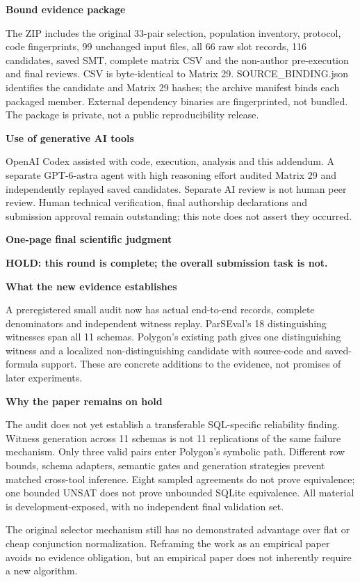 \documentclass[10pt]{article}
\newcommand{\head}[1]{\medskip\textbf{#1}\par}
\begin{document}
\head{Bound evidence package}
The ZIP includes the original 33-pair selection, population inventory, protocol, code fingerprints, 99 unchanged input files, all 66 raw slot records, 116 candidates, saved SMT, complete matrix CSV and the non-author pre-execution and final reviews. CSV is byte-identical to Matrix 29. SOURCE\_BINDING.json identifies the candidate and Matrix 29 hashes; the archive manifest binds each packaged member. External dependency binaries are fingerprinted, not bundled. The package is private, not a public reproducibility release.

\head{Use of generative AI tools}
OpenAI Codex assisted with code, execution, analysis and this addendum. A separate GPT-6-astra agent with high reasoning effort audited Matrix 29 and independently replayed saved candidates. Separate AI review is not human peer review. Human technical verification, final authorship declarations and submission approval remain outstanding; this note does not assert they occurred.

\newpage
{\Large\bfseries One-page final scientific judgment}\par
\textbf{HOLD: this round is complete; the overall submission task is not.}

\head{What the new evidence establishes}
A preregistered small audit now has actual end-to-end records, complete denominators and independent witness replay. ParSEval's 18 distinguishing witnesses span all 11 schemas. Polygon's existing path gives one distinguishing witness and a localized non-distinguishing candidate with source-code and saved-formula support. These are concrete additions to the evidence, not promises of later experiments.

\head{Why the paper remains on hold}
The audit does not yet establish a transferable SQL-specific reliability finding. Witness generation across 11 schemas is not 11 replications of the same failure mechanism. Only three valid pairs enter Polygon's symbolic path. Different row bounds, schema adapters, semantic gates and generation strategies prevent matched cross-tool inference. Eight sampled agreements do not prove equivalence; one bounded UNSAT does not prove unbounded SQLite equivalence. All material is development-exposed, with no independent final validation set.

The original selector mechanism still has no demonstrated advantage over flat or cheap conjunction normalization. Reframing the work as an empirical paper avoids no evidence obligation, but an empirical paper does not inherently require a new algorithm.
\end{document}
